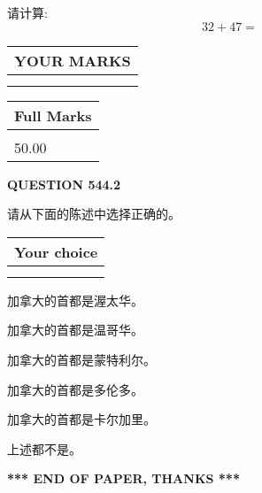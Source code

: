 \documentclass{ctexart}
\begin{document}
  
 
请计算:
\begin{equation}
32 +  %
47 = \nonumber
\end{equation}
 

 

 
  
\vspace{0.2in}
  
\noindent\begin{tabular}{|l|}
\hline
 YOUR MARKS  \\
\hline
 \\ 
 \\ 
\hline
\end{tabular}
\hspace{0.05in} \begin{tabular}{|l|}
\hline
 Full Marks  \\
\hline
 \\ 
50.00 \\
\hline
\end{tabular}
{\textbf{\Large{QUESTION
544.2 
}}}
  
  
请从下面的陈述中选择正确的。
  
  
\noindent\hspace{3.0in} \begin{tabular}{|l|}
\hline
Your choice \\
\hline
 \\ 
 \\ 
\hline
\end{tabular}
  
  
 
 
加拿大的首都是渥太华。
 
 
加拿大的首都是温哥华。
 
 
加拿大的首都是蒙特利尔。
 
 
加拿大的首都是多伦多。
 
 
加拿大的首都是卡尔加里。
 
 
 上述都不是。
 
 
   
   
 \vspace{0.2in}
 
   
   
   
   
\vspace{1.0in} 
{\textbf{\large{ *** END OF PAPER, THANKS *** }}} 
   
\end{document}
